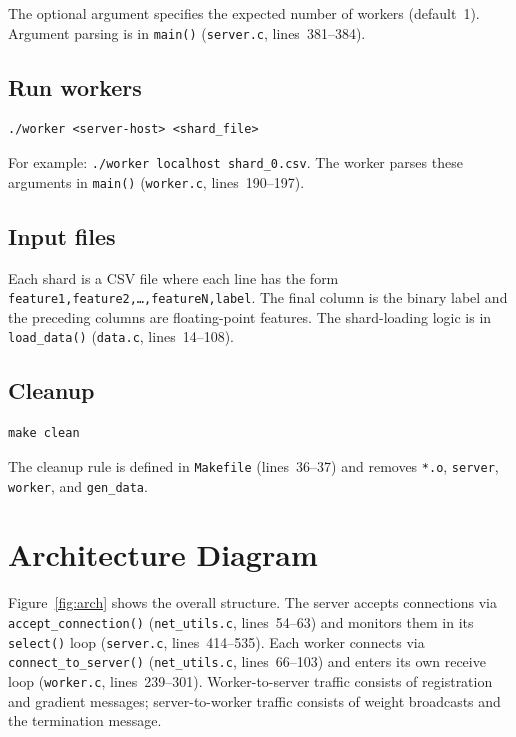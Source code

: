 \documentclass[11pt]{article}
\begin{document}
The optional argument specifies the expected number of workers (default~1). Argument parsing is in \texttt{main()} (\texttt{server.c}, lines~381--384).

\subsection*{Run workers}

\begin{lstlisting}
./worker <server-host> <shard_file>
\end{lstlisting}

For example: \texttt{./worker localhost shard\_0.csv}. The worker parses these arguments in \texttt{main()} (\texttt{worker.c}, lines~190--197).

\subsection*{Input files}

Each shard is a CSV file where each line has the form \texttt{feature1,feature2,\ldots,featureN,label}. The final column is the binary label and the preceding columns are floating-point features. The shard-loading logic is in \texttt{load\_data()} (\texttt{data.c}, lines~14--108).

\subsection*{Cleanup}

\begin{lstlisting}
make clean
\end{lstlisting}

The cleanup rule is defined in \texttt{Makefile} (lines~36--37) and removes \texttt{*.o}, \texttt{server}, \texttt{worker}, and \texttt{gen\_data}.


\section{Architecture Diagram}

Figure~\ref{fig:arch} shows the overall structure. The server accepts connections via \texttt{accept\_connection()} (\texttt{net\_utils.c}, lines~54--63) and monitors them in its \texttt{select()} loop (\texttt{server.c}, lines~414--535). Each worker connects via \texttt{connect\_to\_server()} (\texttt{net\_utils.c}, lines~66--103) and enters its own receive loop (\texttt{worker.c}, lines~239--301). Worker-to-server traffic consists of registration and gradient messages; server-to-worker traffic consists of weight broadcasts and the termination message.
\end{document}
